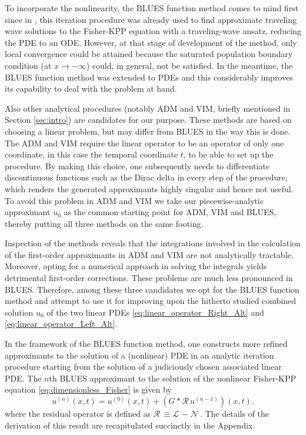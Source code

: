\documentclass[amsmath,amssymb,amsfonts,aps,pre,preprint,superscriptaddress,showpacs,showkeys,longbibliography,nofootinbib]{revtex4-1}
\newcommand*{\lop}{\mathcal{L}\,}
\newcommand*{\nlop}{\mathcal{N}\,}
\newcommand*{\rop}{\mathcal{R}\,}
\begin{document}
To incorporate the nonlinearity, the BLUES function method comes to mind first since in \cite{Berx_2020}, this iteration procedure was already used to find approximate traveling wave solutions to the Fisher-KPP equation with a traveling-wave ansatz, reducing the PDE to an ODE. However, at that stage of development of the method, only local convergence could be attained because the saturated population boundary condition (at $x \to - \infty$) could, in general, not be satisfied. In the meantime, the BLUES function method was extended to PDEs \cite{Berx_2021} and this considerably improves its capability to deal with the problem at hand. 

Also other analytical procedures (notably ADM and VIM, briefly mentioned in Section \ref{sec:intro}) are candidates for our purpose. These methods are based on choosing a linear problem, but may differ from BLUES in the way this is done. The ADM and VIM require the linear operator to be an operator of only one coordinate, in this case the temporal coordinate $t$, to be able to set up the procedure. By making this choice, one subsequently needs to differentiate discontinuous functions such as the Dirac delta in every step of the procedure, which renders the generated approximants highly singular and hence not useful. To avoid this problem in ADM and VIM we take our piecewise-analytic approximant $u_0$ as the common starting point for ADM, VIM and BLUES, thereby putting all three methods on the same footing. 

Inspection of the methods reveals that the integrations involved in the calculation of the first-order approximants in ADM and VIM are not analytically tractable. Moreover, opting for a numerical approach in solving the integrals yields detrimental first-order corrections. These problems are much less pronounced in BLUES. Therefore, among these three candidates we opt for the BLUES function method and attempt to use it for improving upon the hitherto studied combined solution $u_0$ of the two linear PDEs \eqref{eq:linear_operator_Right_Alt} and \eqref{eq:linear_operator_Left_Alt}.

In the framework of the BLUES function method, one constructs more refined approximants to the solution of a (nonlinear) PDE in an analytic iteration procedure starting from the solution of a judiciously chosen associated linear PDE. The $n$th BLUES approximant to the solution of the nonlinear Fisher-KPP equation \eqref{eq:dimensionless_Fisher} is given by
\begin{equation}
    \label{eq:nth_order_u}
    u^{(n)}(x,t) = u^{(0)}(x,t) + (G\ast \rop u^{(n-1)})(x,t).
\end{equation} 
where the residual operator is defined as $\rop \equiv \lop - \nlop$. The details of the derivation of this result are recapitulated succinctly in the Appendix.
\end{document}
